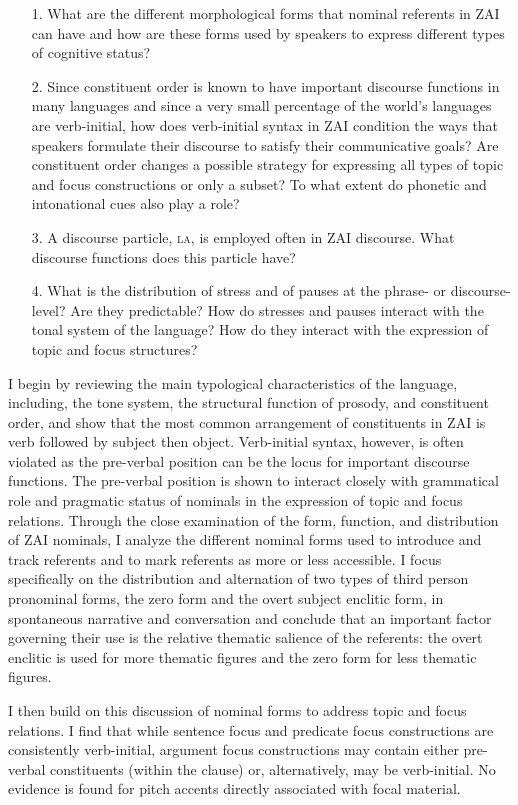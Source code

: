 \begin{itemize}
\item[1.] What are the different morphological forms that nominal referents in ZAI can have and how are these forms used by speakers to express different types of cognitive status?
\item[2.] Since constituent order is known to have important discourse functions in many languages and since a very small percentage of the world's languages are verb-initial, how does verb-initial syntax in ZAI condition the ways that speakers formulate their discourse to satisfy their communicative goals? Are constituent order changes a possible strategy for expressing all types of topic and focus constructions or only a subset? To what extent do phonetic and intonational cues also play a role?
\item[3.] A discourse particle, \textsc{la}, is employed often in ZAI discourse. What discourse functions does this particle have?
\item[4.] What is the distribution of stress and of pauses at the phrase- or discourse-level? Are they predictable? How do stresses and pauses interact with the tonal system of the language? How do they interact with the expression of topic and focus structures?
\end{itemize}

I begin by reviewing the main typological characteristics of the language, including, the tone system, the structural function of prosody, and constituent order, and show that the most common arrangement of constituents in ZAI is verb followed by subject then object. Verb-initial syntax, however, is often violated as the pre-verbal position can be the locus for important discourse functions. The pre-verbal position is shown to interact closely with grammatical role and pragmatic status of nominals in the expression of topic and focus relations. Through the close examination of the form, function, and distribution of ZAI nominals, I analyze the different nominal forms used to introduce and track referents and to mark referents as more or less accessible. I focus specifically on the distribution and alternation of two types of third person pronominal forms, the zero form and the overt subject enclitic form, in spontaneous narrative and conversation and conclude that an important factor governing their use is the relative thematic salience of the referents: the overt enclitic is used for more thematic figures and the zero form for less thematic figures. 

I then build on this discussion of nominal forms to address topic and focus relations. I find that while sentence focus and predicate focus constructions are consistently verb-initial, argument focus constructions may contain either pre-verbal constituents (within the clause) or, alternatively, may be verb-initial. No evidence is found for pitch accents directly associated with focal material. 

